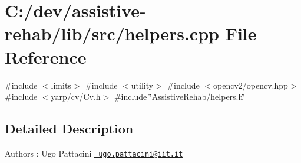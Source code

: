 \section{C\+:/dev/assistive-\/rehab/lib/src/helpers.cpp File Reference}
\label{helpers_8cpp}
{\ttfamily \#include $<$limits$>$}\newline
{\ttfamily \#include $<$utility$>$}\newline
{\ttfamily \#include $<$opencv2/opencv.\+hpp$>$}\newline
{\ttfamily \#include $<$yarp/cv/\+Cv.\+h$>$}\newline
{\ttfamily \#include \char`\"{}Assistive\+Rehab/helpers.\+h\char`\"{}}\newline


\subsection{Detailed Description}
\begin{DoxyAuthor}{Authors}
\+: Ugo Pattacini \href{mailto:ugo.pattacini@iit.it}{\texttt{ ugo.\+pattacini@iit.\+it}} 
\end{DoxyAuthor}
